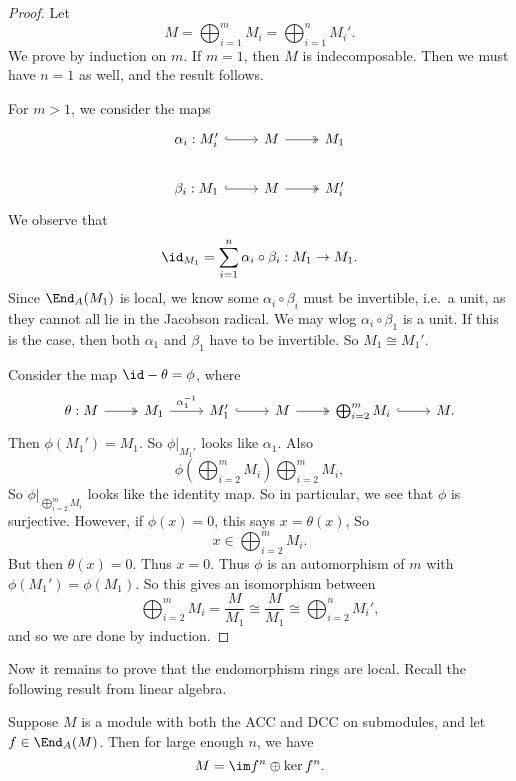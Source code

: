 \documentclass[a4paper]{article}
\begin{document}
\begin{proof} %
  Let
  \[
    M = \bigoplus_{i = 1}^m M_i = \bigoplus_{i = 1}^n M_i'.
  \]
  We prove by induction on $m$. If $m = 1$, then $M$ is indecomposable. Then we must have $n = 1$ as well, and the result follows.

  For $m > 1$, we consider the maps
  \[
    \begin{tikzcd}
      \alpha_i: M_i' \ar[r, hook] & M \ar[r, two heads] & M_1\\
      \beta_i: M_1 \ar[r, hook] & M \ar[r, two heads] & M_i'
    \end{tikzcd}
  \]
  We observe that
  \[
    \id_{M_1} = \sum_{i = 1}^n \alpha_i \circ \beta_i: M_1 \to M_1.
  \]
  Since $\End_A(M_1)$ is local, we know some $\alpha_i \circ \beta_i$ must be invertible, i.e.\ a unit, as they cannot all lie in the Jacobson radical. We may wlog $\alpha_i \circ \beta_1$ is a unit. If this is the case, then both $\alpha_1$ and $\beta_1$ have to be invertible. So $M_1 \cong M_1'$. %

  Consider the map $\id - \theta = \phi$, where
  \[
    \begin{tikzcd}
      \theta: M \ar[r, two heads] & M_1 \ar[r, "\alpha_1^{-1}"] & M_1' \ar[r, hook] & M \ar[r, two heads] & \bigoplus_{i = 2}^m M_i \ar[r, hook] & M.
    \end{tikzcd}
  \]
  Then $\phi(M_1') = M_1$. So $\phi|_{M_1'}$ looks like $\alpha_1$. Also
  \[
    \phi\left(\bigoplus_{i = 2}^m M_i\right) \bigoplus_{i = 2}^m M_i,
  \]
  So $\phi|_{\bigoplus_{i = 2}^m M_i}$ looks like the identity map. So in particular, we see that $\phi$ is surjective. However, if $\phi(x) = 0$, this says $x = \theta(x)$, So
  \[
    x \in \bigoplus_{i = 2}^m M_i.
  \]
  But then $\theta(x) = 0$. Thus $x = 0$. Thus $\phi$ is an automorphism of $m$ with $\phi(M_1') = \phi(M_1)$. So this gives an isomorphism between
  \[
    \bigoplus_{i = 2}^m M_i = \frac{M}{M_1} \cong \frac{M}{M_1} \cong \bigoplus_{i = 2}^n M_i',
  \]
  and so we are done by induction.
\end{proof}

Now it remains to prove that the endomorphism rings are local. Recall the following result from linear algebra.
\begin{lemma}[Fitting]
  Suppose $M$ is a module with both the ACC and DCC on submodules, and let $f \in \End_A(M)$. Then for large enough $n$, we have
  \[
    M = \im f^n \oplus \ker f^n.
  \]
\end{lemma}
\end{document}
